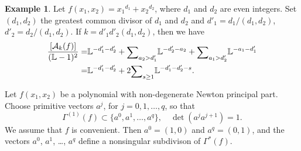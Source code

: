 \documentclass[12pt,a4paper,leqno]{amsart}
\theoremstyle{definition}
\newtheorem{exam}[thm]{Example}
\begin{document}
\begin{exam}
Let $f(x_1,x_2)={x_1}^{d_1}+{x_2}^{d_2}$,
where $d_1$ and $d_2$ are even integers. 
Set $(d_1,d_2)$ the greatest common divisor of $d_1$ and $d_2$
and $d'_1=d_1/(d_1,d_2)$, $d'_2=d_2/(d_1,d_2)$. 
If $k=d'_1d'_2(d_1,d_2)$, then we have
\begin{align*}
\frac{[\mathcal A_k(f)]}{({\mathbb{L}}-1)^2}
=&
{\mathbb{L}}^{-d'_1-d'_2}
+{\mathop{\textrm{\scriptsize $\mathop\sum$}}}_{a_2>d_1'}{\mathbb{L}}^{-d'_2-a_2}
+{\mathop{\textrm{\scriptsize $\mathop\sum$}}}_{a_1>d'_2}{\mathbb{L}}^{-a_1-d'_1}
\\
=&
{\mathbb{L}}^{-d'_1-d'_2}
+2{\mathop{\textrm{\scriptsize $\mathop\sum$}}}_{s\ge1}{\mathbb{L}}^{-d'_1-d'_2-s}. 
\end{align*}
\end{exam}

Let $f(x_1,x_2)$ be a polynomial with non-degenerate Newton principal
part.
Choose primitive vectors $a^j$, for $j=0,1,\dots,q$, so that 
$$
\Gamma^{(1)}(f)\subset\{a^0,a^1,\dots,a^q\},\quad \det(a^j a^{j+1})=1. 
$$
We assume that $f$ is convenient. 
Then $a^0=(1,0)$ and $a^q=(0,1)$, and the vectors $a^0$, $a^1$, \dots,
$a^{q}$ define a nonsingular subdivison of $\Gamma^*(f)$.  
\end{document}
